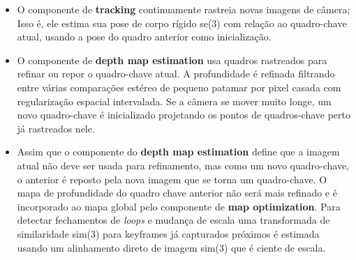 \begin{itemize}
	\item{O componente de \textbf{tracking} continuamente rastreia novas imagens de câmera; Isso é, ele estima sua pose de corpo rígido   se(3) com relação ao quadro-chave atual, usando a pose do quadro anterior como inicialização.}
	\item{O componente de \textbf{depth map estimation} usa quadros rastreados para refinar ou repor o quadro-chave atual. A profundidade é refinada filtrando entre várias comparações estéreo de pequeno patamar por pixel casada com regularização espacial intervalada. Se a câmera se mover muito longe, um novo quadro-chave é inicializado projetando os pontos de quadros-chave perto já rastreados nele.}
	\item{Assim que o componente do \textbf{depth map estimation} define que a imagem atual não deve ser usada para refinamento, mas como um novo quadro-chave, o anterior é reposto pela nova imagem que se torna um quadro-chave. O mapa de profundidade do quadro chave anterior não será mais refinado e é incorporado ao mapa global pelo componente de \textbf{map optimization}. Para detectar fechamentos de \textit{loops} e mudança de escala uma transformada de similaridade   sim(3) para keyframes já capturados próximos é estimada usando um alinhamento direto de imagem sim(3) que é ciente de escala.}
\end{itemize}
